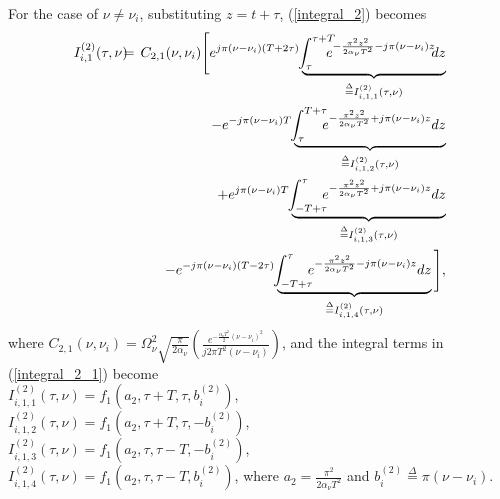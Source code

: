 For the case of $\nu\neq\nu_i$, substituting $z=t+\tau$, (\ref{integral_2}) becomes
\begin{eqnarray}
I_{i,1}^{(2)}(\tau,\nu) & \hspace{-2mm} = & \hspace{-2mm} C_{2,1}(\nu,\nu_i)\Bigg[e^{j\pi (\nu-\nu_{i})(T+2\tau)} 
\underbrace{\hspace{-1mm}\int_{\tau}^{\tau+T}\hspace{-3mm}e^{-\frac{\pi^{2}z^{2}}{2\alpha_{\nu}T^{2}}-j\pi(\nu-\nu_i)z}\hspace{-1mm}dz}_{\overset{\Delta}{=}I_{i,1,1}^{(2)}(\tau,\nu)} 
\nonumber \\
& \hspace{-2mm} & \hspace{-2mm} 
-e^{-j\pi(\nu-\nu_i)T}
\underbrace{\hspace{-1mm}\int_{\tau}^{T+\tau}\hspace{-2mm}e^{-\frac{\pi^{2}z^{2}}{2\alpha_{\nu}T^{2}}+j\pi(\nu-\nu_i)z}dz}_{\overset{\Delta}{=}I_{i,1,2}^{(2)}(\tau,\nu)} 
\nonumber \\
& \hspace{-2mm} & \hspace{-2mm}  
+e^{j\pi(\nu-\nu_i)T}
\underbrace{\hspace{-1mm}\int_{-T+\tau}^{\tau}\hspace{-2mm}e^{-\frac{\pi^{2}z^{2}}{2\alpha_{\nu}T^{2}}+j\pi(\nu-\nu_i)z}dz}_{\overset{\Delta}{=}I_{i,1,3}^{(2)}(\tau,\nu)} 
\nonumber \\
& \hspace{-2mm} & \hspace{-2mm} 
-e^{-j\pi(\nu-\nu_i)(T-2\tau)}
\underbrace{\hspace{-1mm}\int_{-T+\tau}^{\tau}\hspace{-2mm} e^{-\frac{\pi^{2}z^{2}}{2\alpha_{\nu}T^{2}}-j\pi(\nu-\nu_i)z}dz}_{\overset{\Delta}{=}I_{i,1,4}^{(2)}(\tau,\nu)} \Bigg],
\label{integral_2_1}
\end{eqnarray}
where $C_{2,1}(\nu,\nu_i)=\Omega_{\nu}^{2}\sqrt{\frac{\pi}{2\alpha_{\nu}}}\left(\frac{e^{-\frac{\alpha_{\nu}T^{2}}{2}(\nu-\nu_i)^{2}}}{j2\pi T^{2}(\nu-\nu_i)}\right)$, 
and the integral terms in (\ref{integral_2_1}) become \\
$I_{i,1,1}^{(2)}(\tau,\nu)=f_1\left(a_2,\tau+T,\tau,b_i^{(2)}\right)$, \\
$I_{i,1,2}^{(2)}(\tau,\nu)=f_1\left(a_2,\tau+T,\tau,-b_i^{(2)}\right)$, \\
$I_{i,1,3}^{(2)}(\tau,\nu)=f_1\left(a_2,\tau,\tau-T,-b_i^{(2)}\right)$, \\
$I_{i,1,4}^{(2)}(\tau,\nu)=f_1\left(a_2,\tau,\tau-T,b_i^{(2)}\right)$,
where $a_2=\frac{\pi^{2}}{2\alpha_{\nu}T^{2}}$ and
$b_i^{(2)}\overset{\Delta}{=}\pi(\nu-\nu_i)$. 

